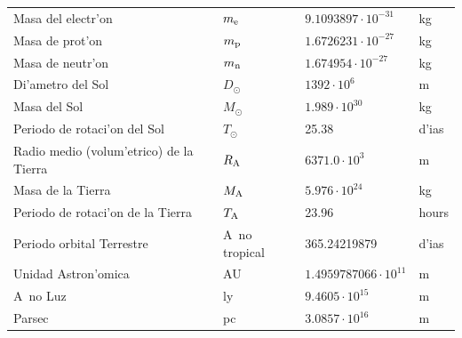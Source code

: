 \begin{center}
\begin{tabular}{||l|lll||}
Masa del electr'on     &$m_{\rm e}$&$9.1093897\cdot10^{-31}$&kg\rule{0pt}{13pt}\\
Masa de prot'on        &$m_{\rm p}$&$1.6726231\cdot10^{-27}$&kg\\
Masa de neutr'on      &$m_{\rm n}$&$1.674954\cdot10^{-27}$&kg\\
\hline
Di'ametro del Sol       &$D_\odot$&$1392\cdot10^6$&m\rule{0pt}{13pt}\\
Masa del Sol             &$M_\odot$&$1.989\cdot10^{30}$&kg\\
Periodo de rotaci'on del Sol &$T_\odot$&25.38&d'ias\\
Radio medio (volum'etrico) de la Tierra     &$R_{\rm A}$&$6371.0\cdot10^3$&m\\
Masa de la Tierra     &$M_{\rm A}$&$5.976\cdot10^{24}$&kg\\
Periodo de rotaci'on de la Tierra   &$T_{\rm A}$&23.96&hours\\
Periodo orbital Terrestre        &A~no tropical&365.24219879&d'ias\\
Unidad Astron'omica            &AU&$1.4959787066\cdot10^{11}$&m\\
A~no Luz                   &ly&$9.4605\cdot10^{15}$&m\\
Parsec                       &pc&$3.0857\cdot10^{16}$&m\\
\hline
\end{tabular}
\end{center}
